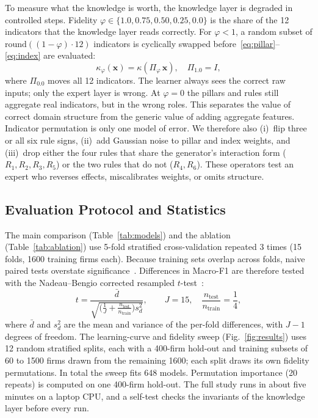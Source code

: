 \documentclass[10pt,journal,compsoc]{IEEEtran}
\begin{document}
To measure what the knowledge is worth, the knowledge layer is degraded in controlled steps. Fidelity \(\varphi\in\{1.0,0.75,0.50,0.25,0.0\}\) is the share of the 12 indicators that the knowledge layer reads correctly. For \(\varphi<1\), a random subset of \(\mathrm{round}((1-\varphi)\cdot 12)\) indicators is cyclically swapped before~\eqref{eq:pillar}--\eqref{eq:index} are evaluated:
\begin{equation}
\kappa_{\varphi}(\mathbf{x})=\kappa(\Pi_{\varphi}\,\mathbf{x}),
\quad
\Pi_{1.0}=I,
\label{eq:fidelity}
\end{equation}
where \(\Pi_{0.0}\) moves all 12 indicators.
The learner always sees the correct raw inputs; only the expert layer is wrong. At \(\varphi=0\) the pillars and rules still aggregate real indicators, but in the wrong roles. This separates the value of correct domain structure from the generic value of adding aggregate features. Indicator permutation is only one model of error. We therefore also (i)~flip three or all six rule signs, (ii)~add Gaussian noise to pillar and index weights, and (iii)~drop either the four rules that share the generator's interaction form (\(R_1,R_2,R_3,R_5\)) or the two rules that do not (\(R_4,R_6\)). These operators test an expert who reverses effects, miscalibrates weights, or omits structure.

\subsection{Evaluation Protocol and Statistics}

The main comparison (Table~\ref{tab:models}) and the ablation (Table~\ref{tab:ablation}) use 5-fold stratified cross-validation repeated 3 times (15 folds, 1600 training firms each). Because training sets overlap across folds, naive paired tests overstate significance~\cite{demsar2006}. Differences in Macro-F1 are therefore tested with the Nadeau--Bengio corrected resampled \(t\)-test~\cite{nadeau2003}:
\begin{equation}
t
=
\frac{\bar{d}}{\sqrt{\bigl(\tfrac{1}{J}+\tfrac{n_{\mathrm{test}}}{n_{\mathrm{train}}}\bigr)s_d^2}},
\qquad
J=15,
\quad
\frac{n_{\mathrm{test}}}{n_{\mathrm{train}}}=\frac{1}{4},
\label{eq:nadeau}
\end{equation}
where \(\bar{d}\) and \(s_d^2\) are the mean and variance of the per-fold differences, with \(J-1\) degrees of freedom. The learning-curve and fidelity sweep (Fig.~\ref{fig:results}) uses 12 random stratified splits, each with a 400-firm hold-out and training subsets of 60 to 1500 firms drawn from the remaining 1600; each split draws its own fidelity permutations. In total the sweep fits 648 models. Permutation importance (20 repeats) is computed on one 400-firm hold-out. The full study runs in about five minutes on a laptop CPU, and a self-test checks the invariants of the knowledge layer before every run.
\end{document}
